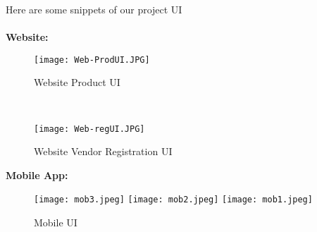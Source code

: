 Here are some snippets of our project UI
\\\\\textbf{Website:}
    \begin{figure}[h]
        \caption{Website Product UI}
        \texttt{[image: Web-ProdUI.JPG]}
        \centering
    \end{figure}
    \\
    \begin{figure}[h]
        \caption{Website Vendor Registration UI}
        \texttt{[image: Web-regUI.JPG]}
        \centering
    \end{figure}
\newpage
\textbf{Mobile App:}
    \begin{figure}[ht!]
        \caption{Mobile UI}
        \texttt{[image: mob3.jpeg]}\hfill
        \texttt{[image: mob2.jpeg]}\hfill
        \texttt{[image: mob1.jpeg]}
    \end{figure}